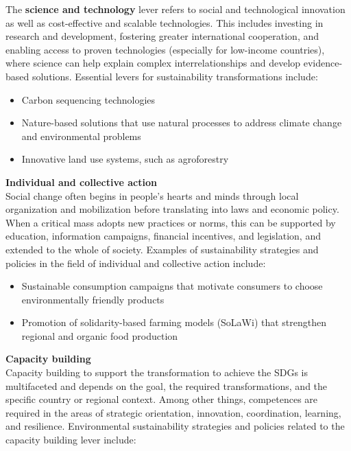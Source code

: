 \documentclass[
  a4paper,
  openany]{book}
\begin{document}
The \textbf{science and technology} lever refers to social and
technological innovation as well as cost-effective and scalable
technologies. This includes investing in research and development,
fostering greater international cooperation, and enabling access to
proven technologies (especially for low-income countries), where science
can help explain complex interrelationships and develop evidence-based
solutions. Essential levers for sustainability transformations include:

\begin{itemize}
\item
  Carbon sequencing technologies
\item
  Nature-based solutions that use natural processes to address climate
  change and environmental problems
\item
  Innovative land use systems, such as agroforestry\\
\end{itemize}

\textbf{Individual and collective action}\\
Social change often begins in people's hearts and minds through local
organization and mobilization before translating into laws and economic
policy. When a critical mass adopts new practices or norms, this can be
supported by education, information campaigns, financial incentives, and
legislation, and extended to the whole of society. Examples of
sustainability strategies and policies in the field of individual and
collective action include:

\begin{itemize}
\item
  Sustainable consumption campaigns that motivate consumers to choose
  environmentally friendly products
\item
  Promotion of solidarity-based farming models (SoLaWi) that strengthen
  regional and organic food production
\end{itemize}

\textbf{Capacity building\\
}Capacity building to support the transformation to achieve the SDGs is
multifaceted and depends on the goal, the required transformations, and
the specific country or regional context. Among other things,
competences are required in the areas of strategic orientation,
innovation, coordination, learning, and resilience. Environmental
sustainability strategies and policies related to the capacity building
lever include:
\end{document}
